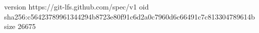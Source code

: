 version https://git-lfs.github.com/spec/v1
oid sha256:c56423789961344294b8723e80f91c6d2a0c7960d6c66491c7c813304789614b
size 26675
